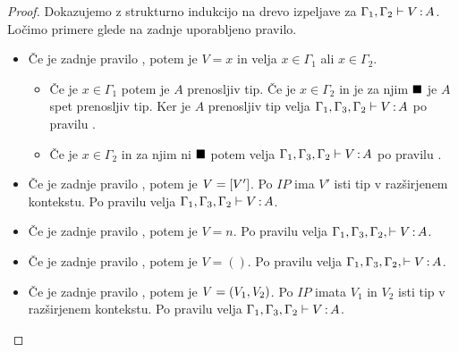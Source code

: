 \begin{proof}
	Dokazujemo z strukturno indukcijo na drevo izpeljave za $\Gamma_1, \Gamma_2 \vdash V \mathinner{:} A$.
	Ločimo primere glede na zadnje uporabljeno pravilo.
	
	\begin{itemize}
		\item Če je zadnje pravilo , potem je $V = x$ in velja $x \in \Gamma_1$ ali $x \in \Gamma_2$.
		\begin{itemize}
			\item Če je $x \in \Gamma_1$ potem je $A$ prenosljiv tip. Če je $x \in \Gamma_2$ in je za njim $\blacksquare$ je $A$ spet prenosljiv tip.
			Ker je $A$ prenosljiv tip velja $\Gamma_1, \Gamma_3, \Gamma_2 \vdash V \mathinner{:} A$ po pravilu .
			\item Če je $x \in \Gamma_2$ in za njim ni $\blacksquare$ potem velja $\Gamma_1, \Gamma_3, \Gamma_2 \vdash V \mathinner{:} A$ po pravilu .
		\end{itemize}
		
		\item Če je zadnje pravilo , potem je $V = [V']$.
		Po $IP$ ima $V'$ isti tip v razširjenem kontekstu.
		Po pravilu  velja $\Gamma_1, \Gamma_3, \Gamma_2 \vdash V \mathinner{:} A$.
		
		\item Če je zadnje pravilo , potem je $V = n$. Po pravilu  velja $\Gamma_1, \Gamma_3, \Gamma_2, \vdash V \mathinner{:} A$.
		
		\item Če je zadnje pravilo , potem je $V = ()$. Po pravilu  velja $\Gamma_1, \Gamma_3, \Gamma_2, \vdash V \mathinner{:} A$.
		
		\item Če je zadnje pravilo , potem je $V =( V_1 , V_2 )$.
		Po $IP$ imata $V_1$ in $V_2$ isti tip v razširjenem kontekstu.
		Po pravilu  velja $\Gamma_1, \Gamma_3, \Gamma_2 \vdash V \mathinner{:} A$.
		

\end{itemize}
\end{proof}
